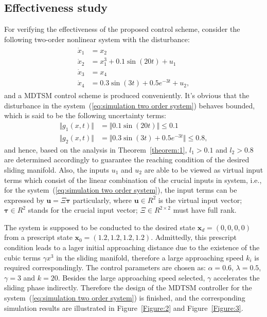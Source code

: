\documentclass[3p]{elsarticle}
\theoremstyle{plain}
\theoremstyle{remark}
\begin{document}
\subsection{Effectiveness study}
For verifying the effectiveness of the proposed control scheme, consider the following two-order nonlinear system with the disturbance:
\begin{align}
\begin{split}
\dot x_1 &= x_2\\
\dot x_2 &= x_1^3+0.1\sin(20t)+u_1\\
\dot x_3 &= x_4\\
\dot x_4 &= 0.3\sin(3t)+0.5e^{-3t}+u_2,\label{eq:simulation two order system}
\end{split}
\end{align}
and a MDTSM control scheme is produced conveniently. It's obvious that the disturbance in the system~(\ref{eq:simulation two order system}) behaves bounded, which is said to be the following uncertainty terms:
\begin{align*}
\Vert g_1(x,t)\Vert &= \Vert 0.1\sin(20t)\Vert\le 0.1\\
\Vert g_2(x,t)\Vert &= \Vert 0.3\sin(3t)+0.5e^{-3t}\Vert\le 0.8,
\end{align*}
and hence, based on the analysis in Theorem~\ref{theorem:1}, $l_1>0.1$ and $l_2>0.8$ are determined accordingly to guarantee the reaching condition of the desired sliding manifold. Also, the inputs $u_1$ and $u_2$ are able to be viewed as virtual input terms which consist of the linear combination of the crucial inputs in system, i.e., for the system~(\ref{eq:simulation two order system}), the input terms can be expressed by $\bm u = \Xi\bm\tau$ particularly, where $\bm u\in R^2$ is the virtual input vector; $\bm \tau\in R^2$ stands for the crucial input vector; $\Xi\in R^{2\times 2}$ must have full rank.\par
The system is supposed to be conducted to the desired state $\bm x_d=(0,0,0,0)$ from a prescript state $\bm x_0=(1.2,1.2,1.2,1.2)$. Admittedly, this prescript condition leads to a lager initial approaching distance due to the existence of the cubic terms $\gamma x^3$ in the sliding manifold, therefore a large approaching speed $k_i$ is required correspondingly. The control parameters are chosen as: $\alpha = 0.6$, $\lambda = 0.5$, $\gamma = 3$ and $k = 20$. Besides the large approaching speed selected, $\gamma$ accelerates the sliding phase indirectly. Therefore the design of the MDTSM controller for the system~(\ref{eq:simulation two order system}) is finished, and the corresponding simulation results are illustrated in Figure~\ref{Figure:2} and Figure~\ref{Figure:3}.\par
\end{document}

